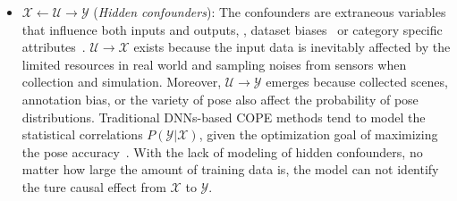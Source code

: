\begin{itemize}
    \item $\mathcal{X} \leftarrow \mathcal{U} \rightarrow \mathcal{Y}$ (\emph{Hidden confounders}): The confounders are extraneous variables that influence both inputs and outputs, \eg, dataset biases~\cite{jung2024housecat6d,zhang2024omni6d} or category specific attributes~\cite{tian2020shape}. $\mathcal{U} \rightarrow \mathcal{X}$ exists because the input data is inevitably affected by the limited resources in real world and sampling noises from sensors when collection and simulation. Moreover, $\mathcal{U} \rightarrow \mathcal{Y}$ emerges because collected scenes, annotation bias, or the variety of pose also affect the probability of pose distributions. Traditional DNNs-based COPE methods tend to model the statistical correlations $P(\mathcal{Y}|\mathcal{X})$, given the optimization goal of maximizing the pose accuracy~\cite{zheng2024georef}. With the lack of modeling of hidden confounders, no matter how large the amount of training data is, the model can not identify the ture causal effect from $\mathcal{X}$ to $\mathcal{Y}$.
\end{itemize}



